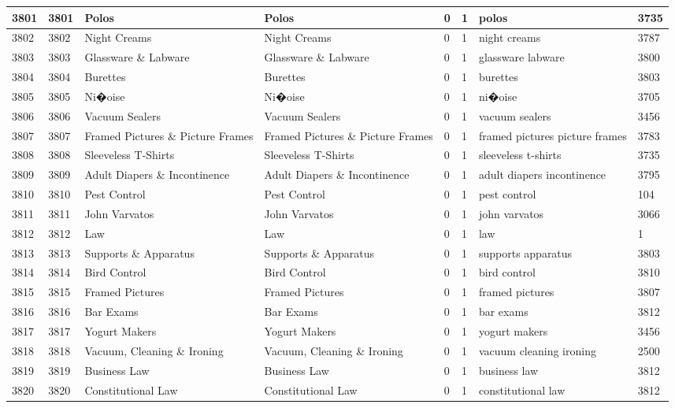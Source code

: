 \begin{longtable}{|l|l|l|l|l|l|l|l|}
3801 & 3801 & Polos & Polos & 0 & 1 & polos & 3735 \\ \hline 
3802 & 3802 & Night Creams & Night Creams & 0 & 1 & night creams & 3787 \\ \hline 
3803 & 3803 & Glassware \& Labware & Glassware \& Labware & 0 & 1 & glassware labware & 3800 \\ \hline 
3804 & 3804 & Burettes & Burettes & 0 & 1 & burettes & 3803 \\ \hline 
3805 & 3805 & Ni�oise & Ni�oise & 0 & 1 & ni�oise & 3705 \\ \hline 
3806 & 3806 & Vacuum Sealers & Vacuum Sealers & 0 & 1 & vacuum sealers & 3456 \\ \hline 
3807 & 3807 & Framed Pictures \& Picture Frames & Framed Pictures \& Picture Frames & 0 & 1 & framed pictures picture frames & 3783 \\ \hline 
3808 & 3808 & Sleeveless T-Shirts & Sleeveless T-Shirts & 0 & 1 & sleeveless t-shirts & 3735 \\ \hline 
3809 & 3809 & Adult Diapers \& Incontinence & Adult Diapers \& Incontinence & 0 & 1 & adult diapers incontinence & 3795 \\ \hline 
3810 & 3810 & Pest Control & Pest Control & 0 & 1 & pest control & 104 \\ \hline 
3811 & 3811 & John Varvatos & John Varvatos & 0 & 1 & john varvatos & 3066 \\ \hline 
3812 & 3812 & Law & Law & 0 & 1 & law & 1 \\ \hline 
3813 & 3813 & Supports \& Apparatus & Supports \& Apparatus & 0 & 1 & supports apparatus & 3803 \\ \hline 
3814 & 3814 & Bird Control & Bird Control & 0 & 1 & bird control & 3810 \\ \hline 
3815 & 3815 & Framed Pictures & Framed Pictures & 0 & 1 & framed pictures & 3807 \\ \hline 
3816 & 3816 & Bar Exams & Bar Exams & 0 & 1 & bar exams & 3812 \\ \hline 
3817 & 3817 & Yogurt Makers & Yogurt Makers & 0 & 1 & yogurt makers & 3456 \\ \hline 
3818 & 3818 & Vacuum, Cleaning \& Ironing & Vacuum, Cleaning \& Ironing & 0 & 1 & vacuum cleaning ironing & 2500 \\ \hline 
3819 & 3819 & Business Law & Business Law & 0 & 1 & business law & 3812 \\ \hline 
3820 & 3820 & Constitutional Law & Constitutional Law & 0 & 1 & constitutional law & 3812 \\ \hline 

\end{longtable}
